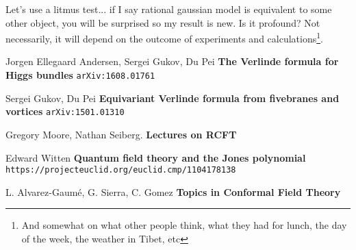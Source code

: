 \documentclass[12pt]{article}
\begin{document}
\noindent Let's use a litmus test... if I say rational gaussian model is equivalent to some other object, you will be surprised so my result is new.  Is it profound?  Not necessarily, it will depend on the outcome of experiments and calculations\footnote{And somewhat on what other people think, what they had for lunch, the day of the week, the weather in Tibet, etc}.


\newpage



\selectfont \fontsize{12}{10}\selectfont

\begin{thebibliography}{}

\item Jorgen Ellegaard Andersen, Sergei Gukov, Du Pei \textbf{The Verlinde formula for Higgs bundles} \texttt{arXiv:1608.01761
}

\item Sergei Gukov, Du Pei
\textbf{Equivariant Verlinde formula from fivebranes and vortices}
\texttt{arXiv:1501.01310}

\item Gregory Moore, Nathan Seiberg. \textbf{Lectures on RCFT}

\item Edward Witten \textbf{Quantum field theory and the Jones polynomial} \texttt{https://projecteuclid.org/euclid.cmp/1104178138}

\item L. Alvarez-Gaum\'{e}, G. Sierra, C. Gomez \textbf{Topics in Conformal Field Theory}

\end{thebibliography}
\end{document}
